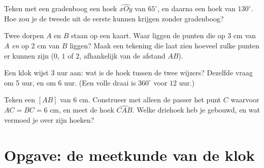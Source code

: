 \begin{exercise}[$\star$]\label{exo:g6:lines:9}
Teken met een gradenboog een hoek $\widehat{xOy}$ van $65^\circ$, en daarna een
hoek van $130^\circ$. Hoe zou je de tweede uit de eerste kunnen krijgen zonder
gradenboog?
\end{exercise}

\begin{exercise}[$\star\star$]\label{exo:g6:lines:10}
Twee dorpen $A$ en $B$ staan op een kaart. Waar liggen de punten die op $3$ cm
van $A$ \emph{en} op $2$ cm van $B$ liggen? Maak een tekening die laat zien
hoeveel zulke punten er kunnen zijn ($0$, $1$ of $2$, afhankelijk van de
afstand $AB$).
\end{exercise}

\begin{exercise}[$\star\star$]\label{exo:g6:lines:11}
Een klok wijst 3 uur aan: wat is de hoek tussen de twee wijzers? Dezelfde
vraag om 5 uur, en om 6 uur. (Een volle draai is $360^\circ$ voor $12$ uur.)
\end{exercise}

\begin{exercise}[$\star\star\star$]\label{exo:g6:lines:12}
Teken een  $[AB]$ van $6$ cm. Construeer met alleen de passer het punt
$C$ waarvoor $AC = BC = 6$ cm, en meet de hoek $\widehat{CAB}$. Welke driehoek
heb je gebouwd, en wat vermoed je over zijn hoeken?
\end{exercise}

\section{Opgave: de meetkunde van de klok}

